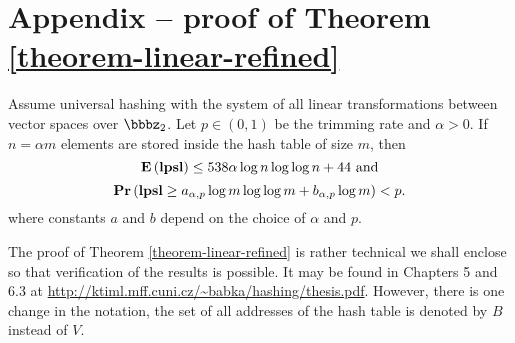 \section*{Appendix -- proof of Theorem \ref{theorem-linear-refined}}
\setcounter{theorem}{2}

\begin{theorem}
Assume universal hashing with the system of all linear transformations between vector spaces over $\bbbz_2$. 
Let $p \in (0, 1)$ be the trimming rate and $\alpha > 0$. 
If $n = \alpha m$ elements are stored inside the hash table of size $m$, then $$\mathbf{E}\left(\mathbf{lpsl}\right) \leq 538 \alpha \log n \log \log n + 44\mbox{ and}$$ $$\mathbf{Pr}\left(\mathbf{lpsl} \geq a_{\alpha, p} \log m \log \log m + b_{\alpha, p}\log m\right) < p.$$ where constants $a$ and $b$ depend on the choice of $\alpha$ and $p$.
\end{theorem}

The proof of Theorem \ref{theorem-linear-refined} is rather technical we shall enclose so that verification of the results is possible.
It may be found in Chapters 5 and 6.3 at \url{http://ktiml.mff.cuni.cz/~babka/hashing/thesis.pdf}.
However, there is one change in the notation, the set of all addresses of the hash table is denoted by $B$ instead of $V$.
